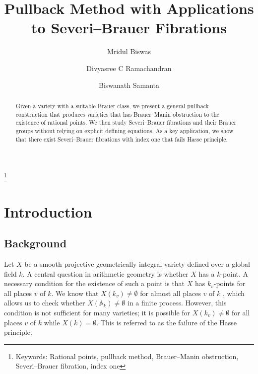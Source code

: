 \documentclass[11pt]{amsart}
\theoremstyle{plain}
\theoremstyle{definition}
\newcommand{\A}{{\mathbb A}}
\begin{document}
	\title{
    Pullback Method with Applications to Severi--Brauer Fibrations}
	\author[M. Biswas]{Mridul Biswas} \address{School of Mathematics and Statistics, University of Canterbury, Christchurch, 8041, New Zealand } 
	\author[D. C. R]{Divyasree C Ramachandran} \address{Department of Mathematics, Indian Institute of Science Education and Research Pune, Dr Homi Bhabha Rd, Pashan, Pune, 411008, India}
	\author[B. Samanta]{Biswanath Samanta} \address{Department of Mathematics, Indian Institute of Science Education and Research Pune, Dr Homi Bhabha Rd, Pashan, Pune, 411008, India}
	
	\thanks{Keywords: Rational points, pullback method,  Brauer--Manin obstruction, Severi--Brauer fibration, index one}
	
	\begin{abstract}
Given a variety with a suitable Brauer class, we present a general pullback construction that produces varieties that has Brauer--Manin obstruction to the existence of rational points. We then study Severi--Brauer fibrations and their Brauer groups without relying on explicit defining equations. As a key application, we show that there exist Severi--Brauer fibrations with index one that fails Hasse principle.
	\end{abstract}
	
	\maketitle

\section{Introduction}
\subsection{Background}
Let $X$ be a smooth projective geometrically integral variety defined over a global field $k$. A central question in arithmetic geometry is whether $X$ has a $k$-point. A necessary condition for the existence of such a point is that $X$ has $k_{v}$-points for all places $v$ of $k$. We know that $X(k_{v}) \neq \emptyset$ for almost all places $v$ of $k$ \cite[Theorem 7.7.2]{poonen}, which allows us to check whether \( X(\A_k) \neq \emptyset \) in a finite process.  However, this condition is not sufficient for many varieties; it is possible for \( X(k_v) \neq \emptyset \) for all places \( v \) of \( k \) while \( X(k) = \emptyset \). This is referred to as the failure of the Hasse principle.
    
\end{document}
